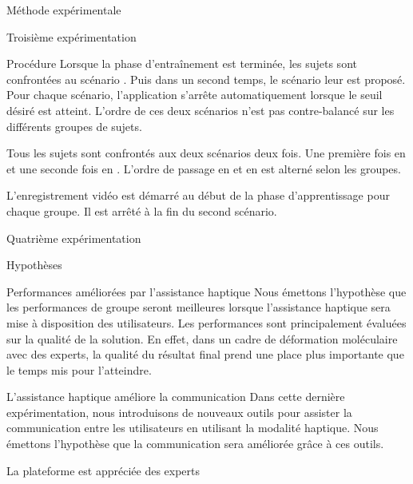 \documentclass[myfrancais,ngerman,english,french]{mythesis}
\begin{document}
\begin{mychapter}{Méthode expérimentale}
\begin{mysection}{Troisième expérimentation}
\begin{mysubsection}{Procédure}
				Lorsque la phase d'entraînement est terminée, les sujets sont confrontées au scénario .
				Puis dans un second temps, le scénario  leur est proposé.
				Pour chaque scénario, l'application s'arrête automatiquement lorsque le seuil   désiré est atteint.
				L'ordre de ces deux scénarios n'est pas contre-balancé sur les différents groupes de sujets.

				Tous les sujets sont confrontés aux deux scénarios deux fois.
				Une première fois en  et une seconde fois en .
				L'ordre de passage en  et en  est alterné selon les groupes.

				L'enregistrement vidéo est démarré au début de la phase d'apprentissage pour chaque groupe.
				Il est arrêté à la fin du second scénario.
			\end{mysubsection}
		\end{mysection}
		\begin{mysection}{Quatrième expérimentation}
			\begin{mysubsection}{Hypothèses}
				\begin{myparagraph}{ Performances améliorées par l'assistance haptique}
					Nous émettons l'hypothèse que les performances de groupe seront meilleures lorsque l'assistance haptique sera mise à disposition des utilisateurs.
					Les performances sont principalement évaluées sur la qualité de la solution.
					En effet, dans un cadre de déformation moléculaire avec des experts, la qualité du résultat final prend une place plus importante que le temps mis pour l'atteindre.
				\end{myparagraph}
				\begin{myparagraph}{ L'assistance haptique améliore la communication}
					Dans cette dernière expérimentation, nous introduisons de nouveaux outils pour assister la communication entre les utilisateurs en utilisant la modalité haptique.
					Nous émettons l'hypothèse que la communication sera améliorée grâce à ces outils.
				\end{myparagraph}
				\begin{myparagraph}{ La plateforme est appréciée des experts}

\end{myparagraph}
\end{mysubsection}
\end{mysection}
\end{mychapter}
\end{document}
